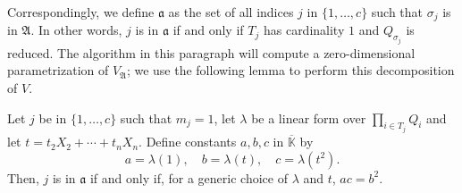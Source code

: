\documentclass[12pt]{article}
\def\Kbar {{\ensuremath{\overline{\mathbb{K}}}}}
\begin{document}
Correspondingly, we define $\mathfrak{a}$ as the set of all indices
$j$ in $\{1,\dots,c\}$ such that $\sigma_j$ is in $\mathfrak{A}$. In
other words, $j$ is in $\mathfrak{a}$ if and only if $T_j$ has
cardinality $1$ and $Q_{\sigma_j}$ is reduced.  The algorithm in this
paragraph will compute a zero-dimensional parametrization of
$V_{\mathfrak{A}}$; we use the following lemma to perform this
decomposition of $V$.

\begin{lemma}\label{lemma:acb2}
	Let $j$ be in $\{1,\dots,c\}$ such that $m_j=1$, let $\lambda$ be a
	linear form over $\prod_{i \in T_j} Q_i$ and let $t=t_2 X_2
	+ \cdots + t_n X_n$. Define constants $a,b,c$ in $\Kbar$ by
	$$a=\lambda(1),\quad b=\lambda(t),\quad c=\lambda(t^2).$$
	Then, $j$ is in $\mathfrak{a}$
	if and only if, for a generic choice of $\lambda$ and $t$, $ac=b^2$.
\end{lemma}
\end{document}
